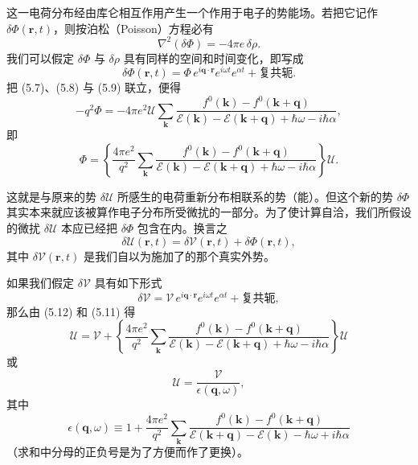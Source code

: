 这一电荷分布经由库仑相互作用产生一个作用于电子的势能场。若把它记作 $\delta\Phi(\mathbf{r},t)$，则按泊松（Poisson）方程必有
\begin{equation*}
\nabla^{2}(\delta\Phi)=-4\pi e\,\delta\rho.
\tag{5.8}
\end{equation*}
我们可以假定 $\delta\Phi$ 与 $\delta\rho$ 具有同样的空间和时间变化，即写成
\begin{equation*}
\delta\Phi(\mathbf{r},t)=\Phi\,e^{i\mathbf{q}\cdot\mathbf{r}}e^{i\omega t}e^{\alpha t}+\text{复共轭}.
\tag{5.9}
\end{equation*}
把 (5.7)、(5.8) 与 (5.9) 联立，便得
\begin{equation*}
-q^{2}\Phi=-4\pi e^{2}\mathcal{U}\sum_{\mathbf{k}}\frac{f^{0}(\mathbf{k})-f^{0}(\mathbf{k}+\mathbf{q})}{\mathcal{E}(\mathbf{k})-\mathcal{E}(\mathbf{k}+\mathbf{q})+\hbar\omega-i\hbar\alpha},
\tag{5.10}
\end{equation*}
即
\begin{equation*}
\Phi=\left\{\frac{4\pi e^{2}}{q^{2}}\sum_{\mathbf{k}}\frac{f^{0}(\mathbf{k})-f^{0}(\mathbf{k}+\mathbf{q})}{\mathcal{E}(\mathbf{k})-\mathcal{E}(\mathbf{k}+\mathbf{q})+\hbar\omega-i\hbar\alpha}\right\}\mathcal{U}.
\tag{5.11}
\end{equation*}

这就是与原来的势 $\delta\mathcal{U}$ 所感生的电荷重新分布相联系的势（能）。但这个新的势 $\delta\Phi$ 其实本来就应该被算作电子分布所受微扰的一部分。为了使计算自洽，我们所假设的微扰 $\delta\mathcal{U}$ 本应已经把 $\delta\Phi$ 包含在内。换言之
\begin{equation*}
\delta\mathcal{U}(\mathbf{r},t)=\delta\mathcal{V}(\mathbf{r},t)+\delta\Phi(\mathbf{r},t),
\tag{5.12}
\end{equation*}
其中 $\delta\mathcal{V}(\mathbf{r},t)$ 是我们自以为施加了的那个真实外势。

如果我们假定 $\delta\mathcal{V}$ 具有如下形式
\begin{equation*}
\delta\mathcal{V}=\mathcal{V}\,e^{i\mathbf{q}\cdot\mathbf{r}}e^{i\omega t}e^{\alpha t}+\text{复共轭},
\tag{5.13}
\end{equation*}
那么由 (5.12) 和 (5.11) 得
\begin{equation*}
\mathcal{U}=\mathcal{V}+\left\{\frac{4\pi e^{2}}{q^{2}}\sum_{\mathbf{k}}\frac{f^{0}(\mathbf{k})-f^{0}(\mathbf{k}+\mathbf{q})}{\mathcal{E}(\mathbf{k})-\mathcal{E}(\mathbf{k}+\mathbf{q})+\hbar\omega-i\hbar\alpha}\right\}\mathcal{U}
\tag{5.14}
\end{equation*}
或
\begin{equation*}
\mathcal{U}=\frac{\mathcal{V}}{\epsilon(\mathbf{q},\omega)},
\tag{5.15}
\end{equation*}
其中
\begin{equation*}
\epsilon(\mathbf{q},\omega)\equiv 1+\frac{4\pi e^{2}}{q^{2}}\sum_{\mathbf{k}}\frac{f^{0}(\mathbf{k})-f^{0}(\mathbf{k}+\mathbf{q})}{\mathcal{E}(\mathbf{k}+\mathbf{q})-\mathcal{E}(\mathbf{k})-\hbar\omega+i\hbar\alpha}
\tag{5.16}
\end{equation*}
（求和中分母的正负号是为了方便而作了更换）。

